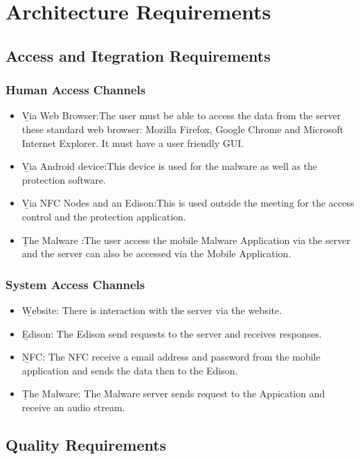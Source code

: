 \documentclass[a4paper,12pt,titlepage]{article}
\begin{document}
	
	
	\newpage
	\tableofcontents
\newpage \section{Architecture Requirements}
\subsection{Access and Itegration Requirements}
\subsubsection{Human Access Channels}
 	\begin{itemize}
 		\item\b{Via Web Browser}:The user must be able to access the data from the server these standard web browser: Mozilla Firefox, Google Chrome and Microsoft Internet Explorer. It must have a user friendly GUI.
 		\item\b{Via Android device}:This device is used for the malware as well as the protection software.
 		\item\b{Via NFC Nodes and an Edison}:This is used outside the meeting for the access control and the protection application.
		\item\b{The Malware} :The user access the mobile Malware Application via the server and the server can also be accessed via the Mobile Application.
	\end{itemize}
\subsubsection{System Access Channels}
	\begin{itemize}
 		\item\b{Website}: There is interaction with the server via the website.
 		\item\b{Edison}: The Edison send requests to the server and receives responses.
 		\item\b{NFC}: The NFC receive  a email address and password from the mobile application and sends the data then to the Edison.
		\item\b{The Malware}: The Malware server sends request to the Appication and receive an audio stream. 
	\end{itemize}

\subsection{Quality Requirements}
\end{document}
